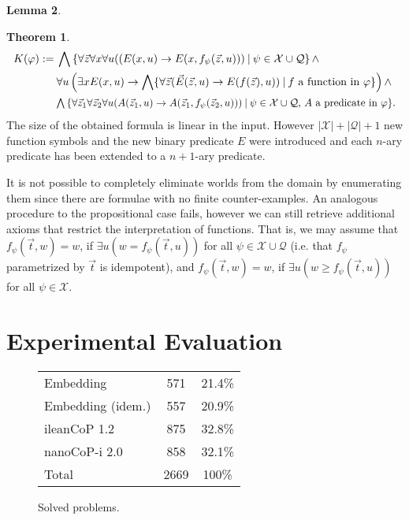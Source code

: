 \documentclass{easychair}
\theoremstyle{definition}
\newtheorem{theorem}{Theorem}[section]
\theoremstyle{definition}
\theoremstyle{definition}
\newtheorem{lemma}[theorem]{Lemma}
\theoremstyle{definition}
\theoremstyle{definition}
\theoremstyle{definition}
\theoremstyle{definition}
\begin{document}
\begin{lemma}
\begin{theorem}
	\begin{align*}
		K(\varphi) := &\:\bigwedge\left\{\forall\vec z\forall x\forall u((E(x, u)\to E(x, f_\psi(\vec z, u)))\:|\:\psi\in\mathcal X\cup\mathcal Q\right\}\wedge\\
		&\:\forall u\left(\exists xE(x, u)\to \bigwedge\{\forall\vec z(\vec E(\vec z, u)\to E(f(\vec z), u))\:|\:\text{$f$ a function in $\varphi$}\}\right)\wedge\\
		&\resizebox{.9\hsize}{!}{$\:\bigwedge\left\{\forall\vec z_1\forall \vec z_2\forall u(A(\vec z_1, u)\to A(\vec z_1, f_\psi(\vec z_2, u)))\:|\:\text{$\psi\in\mathcal X\cup\mathcal Q$, $A$ a predicate in $\varphi$}\right\}$.}
	\end{align*}
	The size of the obtained formula is linear in the input. However $|\mathcal X| + |\mathcal Q| + 1$ new function symbols and the new binary predicate $E$ were introduced and each $n$-ary predicate has been extended to a $n+1$-ary predicate.
\end{theorem}

It is not possible to completely eliminate worlds from the domain by enumerating them since there are formulae with no finite counter-examples. An analogous procedure to the propositional case fails, however we can still retrieve additional axioms that restrict the interpretation of functions. That is, we may assume that $f_\psi(\vec t, w) = w$, if $\exists u(w = f_\psi(\vec t, u))$ for all $\psi\in\mathcal X\cup\mathcal Q$ (i.e. that $f_\psi$ parametrized by $\vec t$ is idempotent), and $f_\psi(\vec t, w) = w$, if $\exists u(w \geq f_\psi(\vec t, u))$ for all $\psi\in\mathcal X$.

\section{Experimental Evaluation}
\label{sec:evaluation}

\begin{wrapfigure}[5]{r}{0.4\textwidth}
	\vspace*{-1.6cm}
	\begin{tabular}{l|c|c}
		Embedding&571&21.4\%\\
		Embedding (idem.)&557&20.9\%\\
		ileanCoP 1.2&875&32.8\%\\
		nanoCoP-i 2.0&858&32.1\%\\\hline
		Total&2669&100\%
	\end{tabular}
	\caption{Solved problems.}
	\label{fig:a}
\end{wrapfigure}


\end{lemma}
\end{document}
